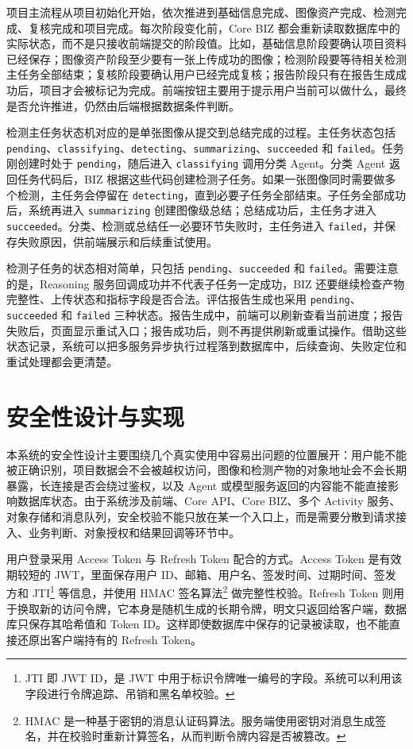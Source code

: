 项目主流程从项目初始化开始，依次推进到基础信息完成、图像资产完成、检测完成、复核完成和项目完成。每次阶段变化前，Core BIZ 都会重新读取数据库中的实际状态，而不是只接收前端提交的阶段值。比如，基础信息阶段要确认项目资料已经保存；图像资产阶段至少要有一张上传成功的图像；检测阶段要等待相关检测主任务全部结束；复核阶段要确认用户已经完成复核；报告阶段只有在报告生成成功后，项目才会被标记为完成。前端按钮主要用于提示用户当前可以做什么，最终是否允许推进，仍然由后端根据数据条件判断。

检测主任务状态机对应的是单张图像从提交到总结完成的过程。主任务状态包括 \texttt{pending}、\texttt{classifying}、\texttt{detecting}、\texttt{summarizing}、\texttt{succeeded} 和 \texttt{failed}。任务刚创建时处于 \texttt{pending}，随后进入 \texttt{classifying} 调用分类 Agent。分类 Agent 返回任务代码后，BIZ 根据这些代码创建检测子任务。如果一张图像同时需要做多个检测，主任务会停留在 \texttt{detecting}，直到必要子任务全部结束。子任务全部成功后，系统再进入 \texttt{summarizing} 创建图像级总结；总结成功后，主任务才进入 \texttt{succeeded}。分类、检测或总结任一必要环节失败时，主任务进入 \texttt{failed}，并保存失败原因，供前端展示和后续重试使用。

检测子任务的状态相对简单，只包括 \texttt{pending}、\texttt{succeeded} 和 \texttt{failed}。需要注意的是，Reasoning 服务回调成功并不代表子任务一定成功，BIZ 还要继续检查产物完整性、上传状态和指标字段是否合法。评估报告生成也采用 \texttt{pending}、\texttt{succeeded} 和 \texttt{failed} 三种状态。报告生成中，前端可以刷新查看当前进度；报告失败后，页面显示重试入口；报告成功后，则不再提供刷新或重试操作。借助这些状态记录，系统可以把多服务异步执行过程落到数据库中，后续查询、失败定位和重试处理都会更清楚。

\section{安全性设计与实现}
\label{sec:implementation-security-design-and-implementation}

本系统的安全性设计主要围绕几个真实使用中容易出问题的位置展开：用户能不能被正确识别，项目数据会不会被越权访问，图像和检测产物的对象地址会不会长期暴露，长连接是否会绕过鉴权，以及 Agent 或模型服务返回的内容能不能直接影响数据库状态。由于系统涉及前端、Core API、Core BIZ、多个 Activity 服务、对象存储和消息队列，安全校验不能只放在某一个入口上，而是需要分散到请求接入、业务判断、对象授权和结果回调等环节中。

用户登录采用 Access Token 与 Refresh Token 配合的方式。Access Token 是有效期较短的 JWT，里面保存用户 ID、邮箱、用户名、签发时间、过期时间、签发方和 JTI\footnote{JTI 即 JWT ID，是 JWT 中用于标识令牌唯一编号的字段。系统可以利用该字段进行令牌追踪、吊销和黑名单校验。} 等信息，并使用 HMAC 签名算法\footnote{HMAC 是一种基于密钥的消息认证码算法。服务端使用密钥对消息生成签名，并在校验时重新计算签名，从而判断令牌内容是否被篡改。} 做完整性校验。Refresh Token 则用于换取新的访问令牌，它本身是随机生成的长期令牌，明文只返回给客户端，数据库只保存其哈希值和 Token ID。这样即使数据库中保存的记录被读取，也不能直接还原出客户端持有的 Refresh Token。

